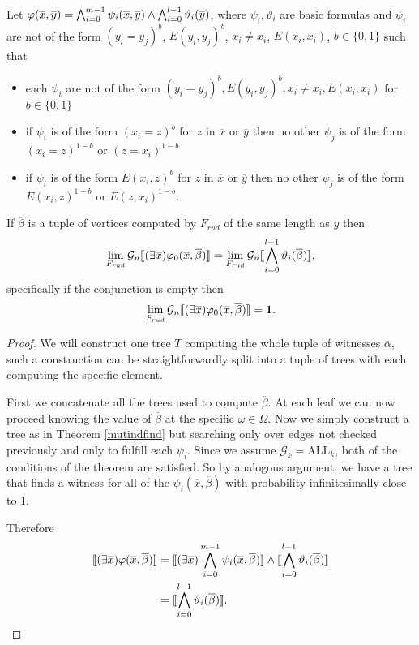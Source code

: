 \begin{thrm}
Let $\varphi(\overline x,\overline y)=\bigwedge_{i=0}^{m-1}\psi_i(\overline x,\overline y)\land \bigwedge_{i=0}^{l-1}\vartheta_i(\overline y)$, where $\psi_i,\vartheta_i$ are basic formulas and $\psi_i$ are not of the form $(y_i=y_j)^b$, $E(y_i,y_j)^b$, $x_i\not= x_i$, $E(x_i,x_i)$, $b\in\{0,1\}$ such that
\begin{itemize}
\item each $\psi_i$ are not of the form $(y_i=y_j)^b,E(y_i,y_j)^b,x_i\not = x_i, E(x_i,x_i)$ for $b\in\{0,1\}$
\item if $\psi_i$ is of the form $(x_i=z)^b$ for $z$ in $\overline x$ or $\overline y$ then no other $\psi_j$ is of the form $(x_i=z)^{1-b}$ or $(z=x_i)^{1-b}$
\item if $\psi_i$ is of the form $E(x_i,z)^b$ for $z$ in $\overline x$ or $\overline y$ then no other $\psi_j$ is of the form $E(x_i,z)^{1-b}$ or $E(z,x_i)^{1-b}$.
\end{itemize}

If $\overline \beta$ is a tuple of vertices computed by $F_{rud}$ of the same length as $\overline y$ then \[\lim_{F_{rud}}\mathcal{G}_n[\![(\exists \overline x)\varphi_0(\overline x,\overline \beta)]\!]=\lim_{F_{rud}}\mathcal{G}_n[\![\bigwedge_{i=0}^{l-1}\vartheta_i(\overline \beta)]\!],\] specifically if the conjunction is empty then
\[\lim_{F_{rud}}\mathcal{G}_n[\![(\exists \overline x)\varphi_0(\overline x,\overline \beta)]\!]=\textbf{1}.\]
\end{thrm}
\begin{proof} We will construct one tree $T$ computing the whole tuple of witnesses $\overline \alpha$, such a construction can be straightforwardly split into a tuple of trees with each computing the specific element.

First we concatenate all the trees used to compute $\overline \beta$. At each leaf we can now proceed knowing the value of $\overline \beta$ at the specific $\omega\in\Omega$. Now we simply construct a tree as in Theorem \ref{mutindfind} but searching only over edges not checked previously and only to fulfill each $\psi_i$. Since we assume $\mathcal{G}_k=\text{ALL}_k$, both of the conditions of the theorem are satisfied. So by analogous argument, we have a tree that finds a witness for all of the $\psi_i(\overline x,\overline \beta)$ with probability infinitesimally close to 1.

Therefore
\begin{align}
\bbl(\exists \overline x)\varphi(\overline x,\overline \beta)\bbr&=\bbl(\exists \overline x)\Land_{i=0}^{m-1}\psi_i(\overline x,\overline \beta)\bbr \land \bbl\Land_{i=0}^{l-1}\vartheta_i(\overline \beta)\bbr\\
&=\bbl\Land_{i=0}^{l-1}\vartheta_i(\overline \beta)\bbr.
\end{align}
\end{proof}

